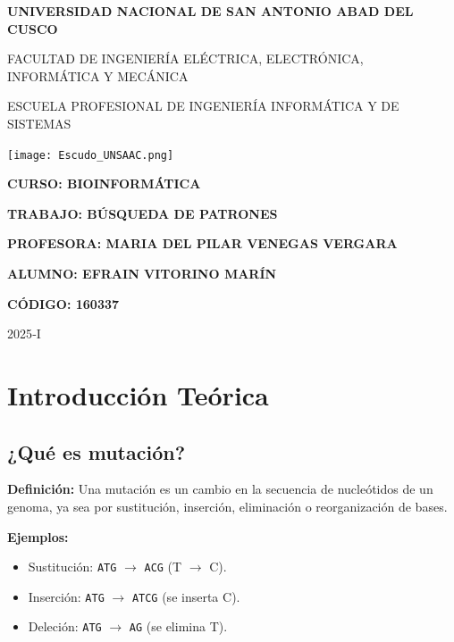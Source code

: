 \documentclass[fleqn,10pt]{article}
\begin{document}
\begin{titlepage}
    \centering
    \vspace*{1cm}
    {\LARGE\bfseries UNIVERSIDAD NACIONAL DE SAN ANTONIO ABAD DEL CUSCO\par}
    \vspace{0.5cm}
    {\Large FACULTAD DE INGENIERÍA ELÉCTRICA, ELECTRÓNICA, INFORMÁTICA Y MECÁNICA\par}
    \vspace{0.5cm}
    {\Large ESCUELA PROFESIONAL DE INGENIERÍA INFORMÁTICA Y DE SISTEMAS\par}
    \vfill
    \texttt{[image: Escudo\_UNSAAC.png]}\par
    \vfill
    {\Large\bfseries CURSO: BIOINFORMÁTICA\par}
    \vspace{0.3cm}
    {\Large\bfseries TRABAJO: BÚSQUEDA DE PATRONES\par}
    \vspace{0.3cm}
    {\Large\bfseries PROFESORA: MARIA DEL PILAR VENEGAS VERGARA\par}
    \vspace{1cm}
    {\Large\bfseries ALUMNO: EFRAIN VITORINO MARÍN\par}
    {\Large\bfseries CÓDIGO: 160337\par}
    \vfill
    {\Large 2025‑I\par}
\end{titlepage}

\setcounter{page}{1}
\pagestyle{plain}
\tableofcontents
\newpage

\section{Introducción Teórica}

\subsection{¿Qué es mutación?}
\textbf{Definición:}
Una mutación es un cambio en la secuencia de nucleótidos de un genoma, ya sea por sustitución, inserción, eliminación o reorganización de bases.

\bigskip
\textbf{Ejemplos:}
\begin{itemize}
    \item Sustitución: \texttt{ATG} \(\to\) \texttt{ACG} (T \(\to\) C).
    \item Inserción:    \texttt{ATG} \(\to\) \texttt{ATCG} (se inserta C).
    \item Deleción:     \texttt{ATG} \(\to\) \texttt{AG}  (se elimina T).
\end{itemize}
\end{document}
